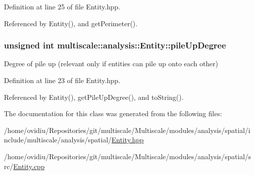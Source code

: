 \-Definition at line 25 of file \-Entity.\-hpp.



\-Referenced by \-Entity(), and get\-Perimeter().

\hypertarget{classmultiscale_1_1analysis_1_1Entity_aae78866cef9fcb7bd2e858570f47d082}{
\subsubsection[{pile\-Up\-Degree}]{\setlength{\rightskip}{0pt plus 5cm}unsigned int {\bf multiscale\-::analysis\-::\-Entity\-::pile\-Up\-Degree}}}\label{classmultiscale_1_1analysis_1_1Entity_aae78866cef9fcb7bd2e858570f47d082}
\-Degree of pile up (relevant only if entities can pile up onto each other) 

\-Definition at line 23 of file \-Entity.\-hpp.



\-Referenced by \-Entity(), get\-Pile\-Up\-Degree(), and to\-String().



\-The documentation for this class was generated from the following files\-:\begin{DoxyCompactItemize}
\item 
/home/ovidiu/\-Repositories/git/multiscale/\-Multiscale/modules/analysis/spatial/include/multiscale/analysis/spatial/\hyperlink{Entity_8hpp}{\-Entity.\-hpp}\item 
/home/ovidiu/\-Repositories/git/multiscale/\-Multiscale/modules/analysis/spatial/src/\hyperlink{Entity_8cpp}{\-Entity.\-cpp}\end{DoxyCompactItemize}
